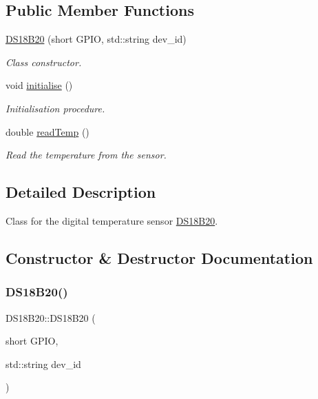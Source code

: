 \subsection*{Public Member Functions}
\begin{DoxyCompactItemize}
\item 
\mbox{\hyperlink{classDS18B20_af99ab621aa1603fe2dbc7ec27d387e02}{D\+S18\+B20}} (short G\+P\+IO, std\+::string dev\+\_\+id)
\begin{DoxyCompactList}\small\item\em Class constructor. \end{DoxyCompactList}\item 
void \mbox{\hyperlink{classDS18B20_ab244f4c5331b543d5e7d7bda33c54e40}{initialise}} ()
\begin{DoxyCompactList}\small\item\em Initialisation procedure. \end{DoxyCompactList}\item 
double \mbox{\hyperlink{classDS18B20_a1abd2723b34fdeb9d538476cfac4f042}{read\+Temp}} ()
\begin{DoxyCompactList}\small\item\em Read the temperature from the sensor. \end{DoxyCompactList}\end{DoxyCompactItemize}


\subsection{Detailed Description}
Class for the digital temperature sensor \mbox{\hyperlink{classDS18B20}{D\+S18\+B20}}. 



\subsection{Constructor \& Destructor Documentation}
\mbox{\label{classDS18B20_af99ab621aa1603fe2dbc7ec27d387e02}} 
\subsubsection{\texorpdfstring{D\+S18\+B20()}{DS18B20()}}
{\footnotesize\ttfamily D\+S18\+B20\+::\+D\+S18\+B20 (\begin{DoxyParamCaption}\item[{short}]{G\+P\+IO,  }\item[{std\+::string}]{dev\+\_\+id }\end{DoxyParamCaption})}



